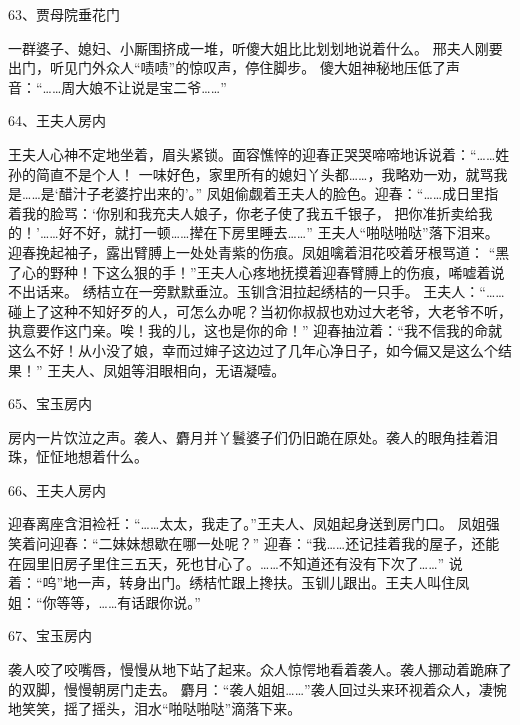 63、贾母院垂花门\par
一群婆子、媳妇、小厮围挤成一堆，听傻大姐比比划划地说着什么。
邢夫人刚要出门，听见门外众人“啧啧”的惊叹声，停住脚步。
傻大姐神秘地压低了声音：“……周大娘不让说是宝二爷……”

64、王夫人房内\par
王夫人心神不定地坐着，眉头紧锁。面容憔悴的迎春正哭哭啼啼地诉说着：“……姓孙的简直不是个人！
一味好色，家里所有的媳妇丫头都……，我略劝一劝，就骂我是……是‘醋汁子老婆拧出来的’。”
凤姐偷觑着王夫人的脸色。迎春：“……成日里指着我的脸骂：‘你别和我充夫人娘子，你老子使了我五千银子，
把你准折卖给我的！’……好不好，就打一顿……撵在下房里睡去……”
王夫人“啪哒啪哒”落下泪来。迎春挽起袖子，露出臂膊上一处处青紫的伤痕。凤姐噙着泪花咬着牙根骂道：
“黑了心的野种！下这么狠的手！”王夫人心疼地抚摸着迎春臂膊上的伤痕，唏嘘着说不出话来。
绣桔立在一旁默默垂泣。玉钏含泪拉起绣桔的一只手。
王夫人：“……碰上了这种不知好歹的人，可怎么办呢？当初你叔叔也劝过大老爷，大老爷不听，
执意要作这门亲。唉！我的儿，这也是你的命！”
迎春抽泣着：“我不信我的命就这么不好！从小没了娘，幸而过婶子这边过了几年心净日子，如今偏又是这么个结果！”
王夫人、凤姐等泪眼相向，无语凝噎。

65、宝玉房内\par
房内一片饮泣之声。袭人、麝月并丫鬟婆子们仍旧跪在原处。袭人的眼角挂着泪珠，怔怔地想着什么。

66、王夫人房内\par
迎春离座含泪裣衽：“……太太，我走了。”王夫人、凤姐起身送到房门口。
凤姐强笑着问迎春：“二妹妹想歇在哪一处呢？”
迎春：“我……还记挂着我的屋子，还能在园里旧房子里住三五天，死也甘心了。……不知道还有没有下次了……”
说着：“呜”地一声，转身出门。绣桔忙跟上搀扶。玉钏儿跟出。王夫人叫住凤姐：“你等等，……有话跟你说。”

67、宝玉房内\par
袭人咬了咬嘴唇，慢慢从地下站了起来。众人惊愕地看着袭人。袭人挪动着跪麻了的双脚，慢慢朝房门走去。
麝月：“袭人姐姐……”袭人回过头来环视着众人，凄惋地笑笑，摇了摇头，泪水“啪哒啪哒”滴落下来。

